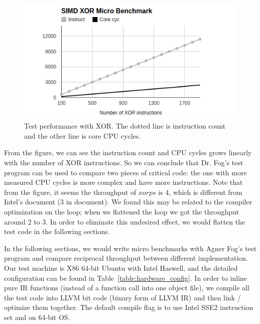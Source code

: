 \begin{figure}[ht!]
\centering
\includegraphics[width=140mm]{draw/testp_xor.png}
\caption[Test Performance with XOR]{Test performance with XOR\@. The dotted line is instruction count and the other line is core CPU cycles.}
\label{figure:testp_xor}
\end{figure}

From the figure, we can see the instruction count and CPU cycles grows linearly with the number of XOR instructions. So we can conclude that Dr. Fog's test program can be used to compare two pieces of critical code: the one with more measured CPU cycles is more complex and have more instructions. Note that from the figure, it seems the throughput of $xorps$ is 4, which is different from Intel's document (3 in document). We found this may be related to the compiler optimization on the loop; when we flattened the loop we got the throughput around 2 to 3. In order to eliminate this undesired effect, we would flatten the test code in the following sections.

In the following sections, we would write micro benchmarks with Agner Fog's test program and compare reciprocal throughput between different implementation. Our test machine is X86 64-bit Ubuntu with Intel Haswell, and the detailed configuration can be found in Table~\ref{table:hardware_config}. In order to inline pure IR functions (instead of a function call into one object file), we compile all the test code into LLVM bit code (binary form of LLVM IR) and then link / optimize them together. The default compile flag is to use Intel SSE2 instruction set and on 64-bit OS.

